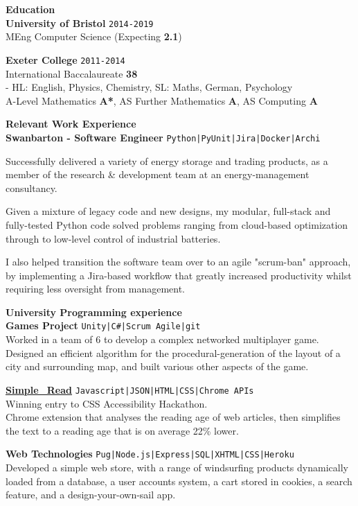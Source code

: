 \documentclass[10pt]{article}
\newcommand{\bold}[1]{\textbf{\textcolor{dark}{#1}}}
\newcommand{\sect}[1]{{\LARGE\bold{#1}}\vspace{0.2em}\\}
\newcommand{\zz}[3]{{\large\bold{#1}} \hfill {\small \colorbox{light}{\texttt{#3}}}\\{#2}\vspace{0.5em}}
\newcommand{\li}{\textcolor{mid}{|}}
\begin{document}
\begin{minipage}[t]{0.65\textwidth}
\raggedright


\sect{Education}
\zz{University of Bristol}
{MEng Computer Science \small{(Expecting \bold{2.1})}}{2014-2019}

\zz{Exeter College}
{International Baccalaureate \bold{38} \\  
\hspace{1em} {\small - HL: English, Physics, Chemistry, SL: Maths, German, Psychology}\\
A-Level Mathematics \bold{A*}, AS Further Mathematics \bold{A}, AS Computing \bold{A}}
{2011-2014}


\vspace{0.4em}
\sect{Relevant Work Experience}

\zz{Swanbarton - Software Engineer}
{Successfully delivered a variety of energy storage and trading products, as a member of the research \& development team at an energy-management consultancy.

Given a mixture of legacy code and new designs, my modular, full-stack and fully-tested Python code solved problems ranging from cloud-based optimization through to low-level control of industrial batteries.

I also helped transition the software team over to an agile "scrum-ban" approach, by implementing a Jira-based workflow that greatly increased productivity whilst requiring less oversight from management.}
{Python\li PyUnit\li Jira\li Docker\li Archi}




\vspace{0.35em}
\sect{University Programming experience}

\zz{Games Project}
{Worked in a team of 6 to develop a complex networked multiplayer game.\\
Designed an efficient algorithm for the procedural-generation of the layout of a city and surrounding map, and built various other aspects of the game.}
{Unity\li C\#\li Scrum Agile\li git}

\zz{\href{https://lukestorry.co.uk/simple_read/}{Simple\_Read}}
{Winning entry to CSS Accessibility Hackathon.\\
Chrome extension that analyses the reading age of web articles, then simplifies the text to a reading age that is on average 22\% lower.}{Javascript\li JSON\li HTML\li CSS\li Chrome APIs}

\zz{Web Technologies}
{Developed a simple web store, with a range of windsurfing products dynamically loaded from a database, a  user accounts system, a cart stored in cookies, a search feature, and a design-your-own-sail app.}
{Pug\li Node.js\li Express\li SQL\li XHTML\li CSS\li Heroku}


\end{minipage}
\end{document}
